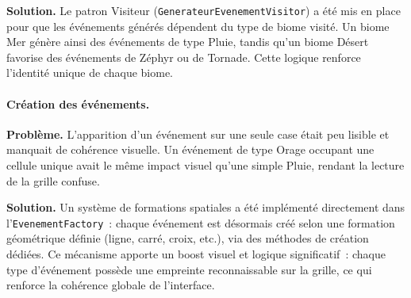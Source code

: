 \textbf{Solution.}
Le patron Visiteur (\texttt{GenerateurEvenementVisitor}) a été mis en place pour
que les événements générés dépendent du type de biome visité. Un biome Mer génère
ainsi des événements de type Pluie, tandis qu'un biome Désert favorise des
événements de Zéphyr ou de Tornade. Cette logique renforce l'identité unique de
chaque biome.

\paragraph{Création des événements.}
\textbf{Problème.}
L'apparition d'un événement sur une seule case était peu lisible et manquait de
cohérence visuelle. Un événement de type Orage occupant une cellule unique avait le
même impact visuel qu'une simple Pluie, rendant la lecture de la grille confuse.

\textbf{Solution.}
Un système de formations spatiales a été implémenté directement dans
l'\texttt{EvenementFactory}~: chaque événement est désormais créé selon une
formation géométrique définie (ligne, carré, croix, etc.), via des méthodes de
création dédiées. Ce mécanisme apporte un boost visuel et logique significatif~:
chaque type d'événement possède une empreinte reconnaissable sur la grille, ce qui
renforce la cohérence globale de l'interface.
